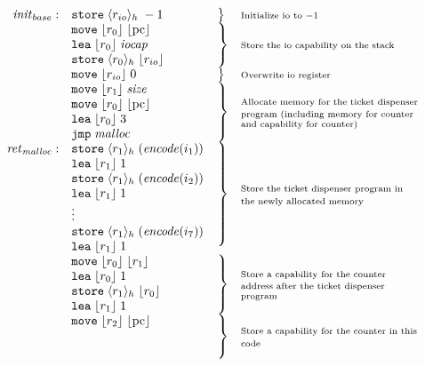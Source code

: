 \documentclass{article}
\newcommand{\pcreg}{\mathrm{pc}}
\newcommand{\plainfun}[1]{\mathit{#1}}
\newcommand{\encode}{\plainfun{encode}}
\newcommand{\codelabel}[1]{\mathit{#1}}
\newcommand{\malloc}{\codelabel{malloc}}
\newcommand{\iocap}{\codelabel{iocap}}
\newcommand{\refreg}[1]{\lfloor #1 \rfloor}
\newcommand{\refheap}[1]{\langle #1 \rangle_h}
\newcommand{\instr}[1]{\mathtt{#1}}
\newcommand{\oneinstr}[2]{\instr{#1} \; #2}
\newcommand{\jmp}[1]{\oneinstr{jmp}{#1}}
\newcommand{\twoinstr}[3]{\instr{#1} \; #2 \; #3}
\newcommand{\move}[2]{\twoinstr{move}{#1}{#2}}
\newcommand{\store}[2]{\twoinstr{store}{#1}{#2}}
\newcommand{\lea}[2]{\twoinstr{lea}{#1}{#2}}
\begin{document}
\[
  \begin{array}{r l l p{\mrlen}}
\initb:     & \store{\refheap{\rio}}{-1} & \bracket{1} & \annotate{1}{Initialize io to $-1$} \\
           & \move{\refreg{r_0}}{\refreg{\pcreg}} & \bracket{3} & \annotate{3}{Store the io capability on the stack} \\
           & \lea{\refreg{r_0}}{\iocap} & & \\
           & \store{\refheap{r_0}}{\refreg{\rio}} & & \\
           & \move{\refreg{\rio}}{0} & \bracket{1} & \annotate{1}{Overwrite io register} \\
           & \move{\refreg{r_1}}{\size} &  \bracket{4} & \annotate{4}{Allocate memory for the ticket dispenser program (including memory for counter and capability for counter)}\\
           & \move{\refreg{r_0}}{\refreg{\pcreg}} & & \\
           & \lea{\refreg{r_0}}{3} & & \\
           & \jmp{\malloc} & & \\
\retm:     & \store{\refheap{r_1}}{(\encode(i_1))} & \bracket{7} & \annotate{7}{Store the ticket dispenser program in the newly allocated memory} \\
           & \lea{\refreg{r_1}}{1} & & \\
           & \store{\refheap{r_1}}{(\encode(i_2))} & & \\
           & \lea{\refreg{r_1}}{1} & & \\
           & \vdots & & \\
           & \store{\refheap{r_1}}{(\encode(i_7))} & & \\
           & \lea{\refreg{r_1}}{1} & & \\
           & \move{\refreg{r_0}}{\refreg{r_1}} & \bracket{4} & \annotate{4}{Store a capability for the counter address after the ticket dispenser program} \\
           & \lea{\refreg{r_0}}{1} & & \\
           & \store{\refheap{r_1}}{\refreg{r_0}} & & \\
           & \lea{\refreg{r_1}}{1} & & \\
           & \move{\refreg{r_2}}{\refreg{\pcreg}} & \bracket{3} & \annotate{3}{Store a capability for the counter in this code} \\

\end{array}\]
\end{document}
